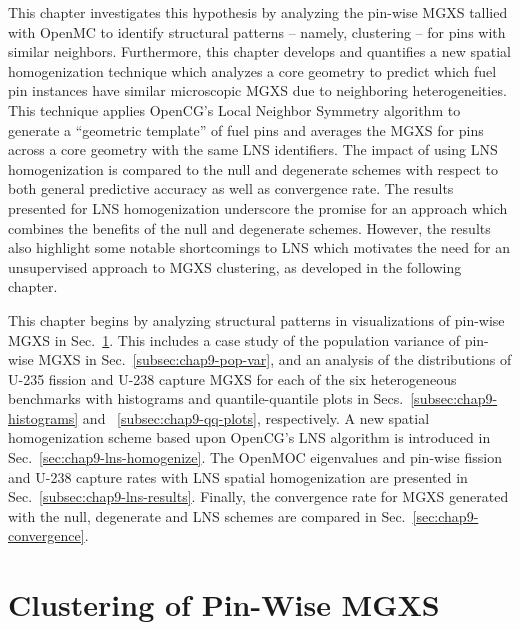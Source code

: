 This chapter investigates this hypothesis by analyzing the pin-wise \ac{MGXS} tallied with OpenMC to identify structural patterns -- namely, clustering -- for pins with similar neighbors. Furthermore, this chapter develops and quantifies a new spatial homogenization technique which analyzes a core geometry to predict which fuel pin instances have similar microscopic \ac{MGXS} due to neighboring heterogeneities. This technique applies OpenCG's Local Neighbor Symmetry algorithm to generate a ``geometric template'' of fuel pins and averages the \ac{MGXS} for pins across a core geometry with the same \ac{LNS} identifiers. The impact of using \ac{LNS} homogenization is compared to the null and degenerate schemes with respect to both general predictive accuracy as well as convergence rate. The results presented for \ac{LNS} homogenization underscore the promise for an approach which combines the benefits of the null and degenerate schemes. However, the results also highlight some notable shortcomings to \ac{LNS} which motivates the need for an unsupervised approach to \ac{MGXS} clustering, as developed in the following chapter.

This chapter begins by analyzing structural patterns in visualizations of pin-wise \ac{MGXS} in Sec.~\ref{sec:chap9-clustering}. This includes a case study of the population variance of pin-wise \ac{MGXS} in Sec.~\ref{subsec:chap9-pop-var}, and an analysis of the distributions of U-235 fission and U-238 capture \ac{MGXS} for each of the six heterogeneous benchmarks with histograms and quantile-quantile plots in Secs.~\ref{subsec:chap9-histograms} and ~\ref{subsec:chap9-qq-plots}, respectively. A new spatial homogenization scheme based upon OpenCG's \ac{LNS} algorithm is introduced in Sec.~\ref{sec:chap9-lns-homogenize}. The OpenMOC eigenvalues and pin-wise fission and U-238 capture rates with \ac{LNS} spatial homogenization are presented in Sec.~\ref{subsec:chap9-lns-results}. Finally, the convergence rate for \ac{MGXS} generated with the null, degenerate and \ac{LNS} schemes are compared in Sec.~\ref{sec:chap9-convergence}.


\section{Clustering of Pin-Wise MGXS}
\label{sec:chap9-clustering}

